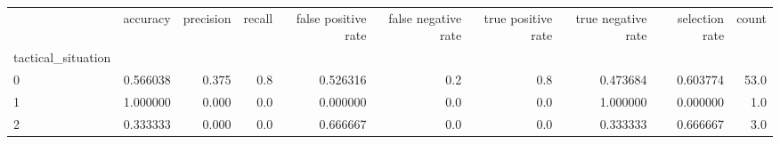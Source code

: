 \begin{tabular}{lrrrrrrrrr}
\toprule
{} &  accuracy &  precision &  recall &  false positive rate &  false negative rate &  true positive rate &  true negative rate &  selection rate &  count \\
tactical\_situation &           &            &         &                      &                      &                     &                     &                 &        \\
\midrule
0                  &  0.566038 &      0.375 &     0.8 &             0.526316 &                  0.2 &                 0.8 &            0.473684 &        0.603774 &   53.0 \\
1                  &  1.000000 &      0.000 &     0.0 &             0.000000 &                  0.0 &                 0.0 &            1.000000 &        0.000000 &    1.0 \\
2                  &  0.333333 &      0.000 &     0.0 &             0.666667 &                  0.0 &                 0.0 &            0.333333 &        0.666667 &    3.0 \\
\bottomrule
\end{tabular}
